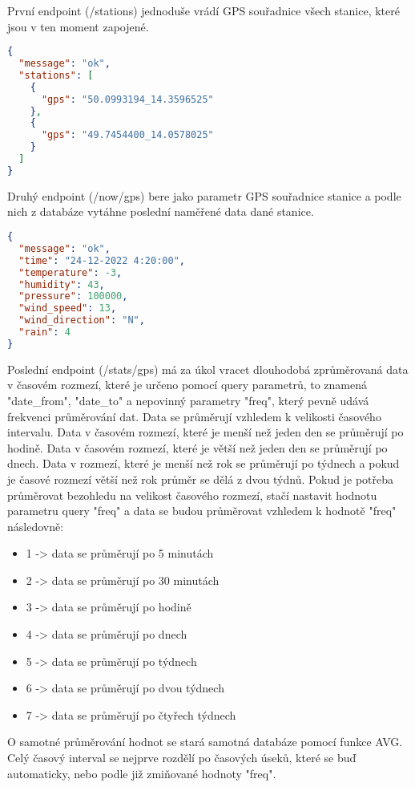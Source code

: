 První endpoint (/stations) jednoduše vrádí GPS souřadnice všech stanice, které jsou v ten moment zapojené.
\begin{lstlisting}[language=json,firstnumber=1, caption=Příklad požadavku /stations]
{
  "message": "ok",
  "stations": [
    {
      "gps": "50.0993194_14.3596525"
    },
    {
      "gps": "49.7454400_14.0578025"
    }
  ]
}
\end{lstlisting}
Druhý endpoint (/now/{gps}) bere jako parametr GPS souřadnice stanice a podle nich z databáze vytáhne poslední naměřené data dané stanice.
\begin{lstlisting}[language=json,firstnumber=1, caption=Příklad požadavku /now/{gps} ]
{
  "message": "ok",
  "time": "24-12-2022 4:20:00",
  "temperature": -3,
  "humidity": 43,
  "pressure": 100000,
  "wind_speed": 13,
  "wind_direction": "N",
  "rain": 4
}
\end{lstlisting}
Poslední endpoint (/stats/{gps}) má za úkol vracet dlouhodobá zprůměrovaná data v časovém rozmezí, které je určeno pomocí query parametrů,
to znamená "date\_from", "date\_to" a nepovinný parametry "freq", který pevně udává frekvenci průměrování dat. Data se průměrují vzhledem k velikosti časového intervalu.
Data v časovém rozmezí, které je menší než jeden den se průměrují po hodině.
Data v časovém rozmezí, které je větší než jeden den se průměrují po dnech. Data v rozmezí, které je menší než rok se průměrují po týdnech
a pokud je časové rozmezí větší než rok průměr se dělá z dvou týdnů. Pokud je potřeba průměrovat bezohledu na velikost časového rozmezí,
stačí nastavit hodnotu parametru query "freq" a data se budou průměrovat vzhledem k hodnotě "freq" následovně:
\begin{itemize}
  \item 1 -> data se průměrují po 5 minutách
  \item 2 -> data se průměrují po 30 minutách
  \item 3 -> data se průměrují po hodině 
  \item 4 -> data se průměrují po dnech 
  \item 5 -> data se průměrují po týdnech 
  \item 6 -> data se průměrují po dvou týdnech 
  \item 7 -> data se průměrují po čtyřech týdnech 
\end{itemize}
O samotné průměrování hodnot se stará samotná databáze pomocí funkce AVG. Celý časový interval se nejprve rozdělí po časových úseků, které se buď automaticky, nebo podle již zmiňované hodnoty "freq".
